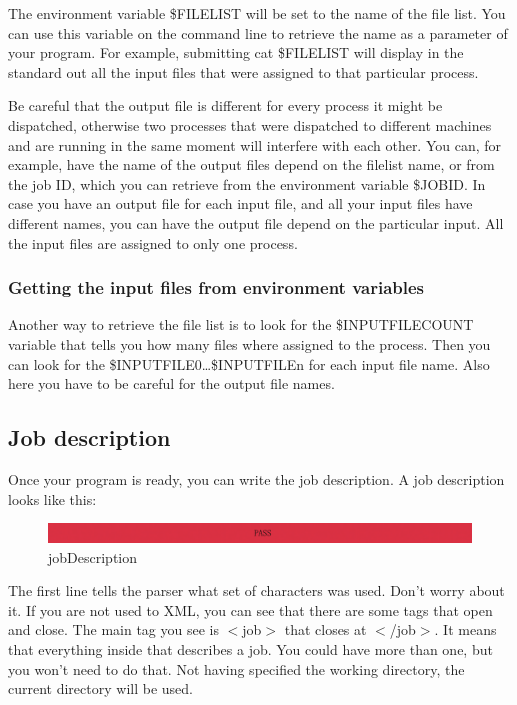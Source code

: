 The environment variable \$FILELIST will be set to the name of the file list.
You can use this variable on the command line to retrieve the name as a parameter of your program.
For example, submitting cat \$FILELIST will display in the standard out all the input files that were assigned to that particular process.

Be careful that the output file is different for every process it might be dispatched,
otherwise two processes that were dispatched to different machines and are running in the same moment will interfere with each other.
You can, for example,
have the name of the output files depend on the filelist name,
or from the job ID,
which you can retrieve from the environment variable \$JOBID.
In case you have an output file for each input file,
and all your input files have different names,
you can have the output file depend on the particular input.
All the input files are assigned to only one process.

\subsubsection{Getting the input files from environment variables}
Another way to retrieve the file list is to look for the \$INPUTFILECOUNT variable that tells you how many files where assigned to the process.
Then you can look for the \$INPUTFILE0\dots\$INPUTFILEn for each input file name.
Also here you have to be careful for the output file names.

\subsection{Job description}
Once your program is ready, you can write the job description. A job description looks like this:
\begin{figure}[hbpt]
  \centering
  \includegraphics[width=\linewidth]{./pictures/pass.pdf}
  \caption{jobDescription}
  \label{fig:jobDescription}
\end{figure}
The first line tells the parser what set of characters was used.
Don't worry about it.
If you are not used to XML,
you can see that there are some tags that open and close.
The main tag you see is $<$job$>$ that closes at $<$/job$>$.
It means that everything inside that describes a job.
You could have more than one,
but you won't need to do that.
Not having specified the working directory,
the current directory will be used.


